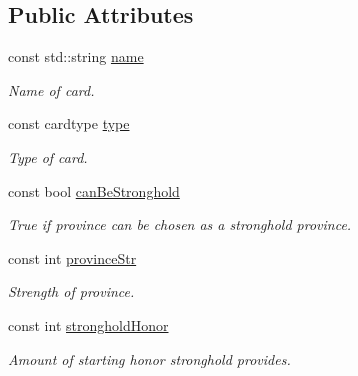 \subsection*{Public Attributes}
\begin{DoxyCompactItemize}
\item 
\mbox{\label{classl5r_1_1CardData_a9e8a18b7c9b76ee2f7905b31ef1540ba}} 
const std\+::string \hyperlink{classl5r_1_1CardData_a9e8a18b7c9b76ee2f7905b31ef1540ba}{name}
\begin{DoxyCompactList}\small\item\em Name of card. \end{DoxyCompactList}\item 
\mbox{\label{classl5r_1_1CardData_ab1748a0a994053730820d9640a4c43aa}} 
const cardtype \hyperlink{classl5r_1_1CardData_ab1748a0a994053730820d9640a4c43aa}{type}
\begin{DoxyCompactList}\small\item\em Type of card. \end{DoxyCompactList}\item 
\mbox{\label{classl5r_1_1CardData_a585e82d9822af147aff17cab13504e5b}} 
const bool \hyperlink{classl5r_1_1CardData_a585e82d9822af147aff17cab13504e5b}{can\+Be\+Stronghold}
\begin{DoxyCompactList}\small\item\em True if province can be chosen as a stronghold province. \end{DoxyCompactList}\item 
\mbox{\label{classl5r_1_1CardData_a33022ed5921a030677b81532331d4cf2}} 
const int \hyperlink{classl5r_1_1CardData_a33022ed5921a030677b81532331d4cf2}{province\+Str}
\begin{DoxyCompactList}\small\item\em Strength of province. \end{DoxyCompactList}\item 
\mbox{\label{classl5r_1_1CardData_aec89444713e22a3efeabbb0dd08772ac}} 
const int \hyperlink{classl5r_1_1CardData_aec89444713e22a3efeabbb0dd08772ac}{stronghold\+Honor}
\begin{DoxyCompactList}\small\item\em Amount of starting honor stronghold provides. \end{DoxyCompactList}\item 

\end{DoxyCompactItemize}
